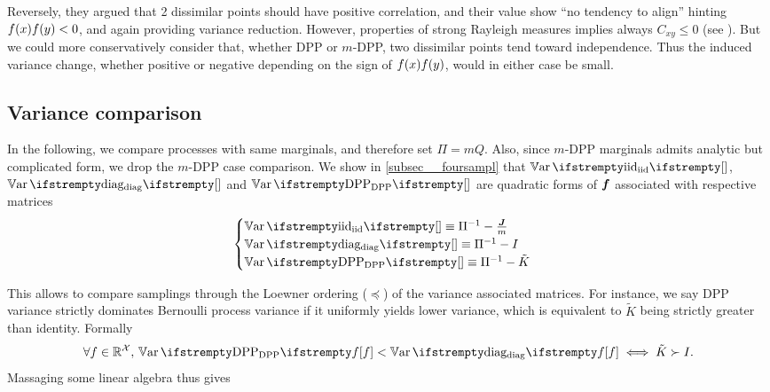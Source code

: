 Reversely, they argued that 2 dissimilar points should have positive correlation, and their value show ``no tendency to align'' hinting $f(x) f(y) < 0$, and again providing variance reduction. However, properties of strong Rayleigh measures implies always $C_{xy}\leq0$ (see \cite{pemantle2011rayleighconcentration}). But we could more conservatively consider that, whether DPP or $m$-DPP, two dissimilar points tend toward independence. Thus the induced variance change, whether positive or negative depending on the sign of $f(x) f(y)$, would in either case be small. 



\subsection{Variance comparison}
In the following, we compare processes with same marginals, and therefore set $\Pi = mQ$. Also, 
since $m$-DPP marginals admits analytic but complicated form, we drop the $m$-DPP case comparison. We show in \cref{subsec__foursampl} that $\Var{\textrm{iid}}{}$, $\Var{\textrm{diag}}{}$ and $\Var{\textrm{DPP}}{}$ are quadratic forms of $\boldsymbol{f}$ associated with respective matrices
$$\begin{cases}
	\Var{\textrm{iid}}{} \equiv \Pi^{-1} - \frac{\moones}{m} \\
	\Var{\textrm{diag}}{} \equiv \Pi^{-1} - I \\
	\Var{\textrm{DPP}}{} \equiv \Pi^{-1} - \tilde K
\end{cases}$$

This allows to compare samplings through the Loewner ordering ($\preceq$) of the variance associated matrices. For instance, we say DPP variance strictly dominates Bernoulli process variance if it uniformly yields lower variance, which is equivalent to $\tilde K$ being strictly greater than identity. Formally 
\begin{equation*}
	\forall \query \in \RR^{\mathcal{X}}, \, \Var{\textrm{DPP}}{f} < \Var{\textrm{diag}}{f} \iff \tilde K \succ I.
\end{equation*}
Massaging some linear algebra thus gives


